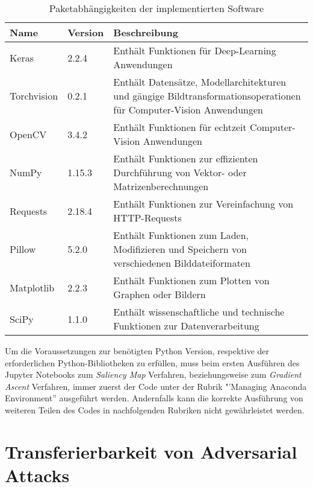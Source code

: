 \begin{table}
	\centering
	\begin{tabular}{|l|l|p{10.4cm}|}
		\hline 
		Name & Version & Beschreibung \\ 
		\hline\hline 
		Keras& 2.2.4  & Enthält Funktionen für Deep-Learning Anwendungen \cite{noauthor_home_nodate} \\ 
		\hline 
		Torchvision& 0.2.1 & Enthält Datensätze, Modellarchitekturen und gängige Bildtransformationsoperationen für Computer-Vision Anwendungen \cite{team_torchvision:_nodate} \\ 
		\hline 
		OpenCV& 3.4.2  & Enthält Funktionen für echtzeit Computer-Vision Anwendungen \cite{noauthor_opencv_nodate} \\ 
		\hline 
		NumPy&  1.15.3& Enthält Funktionen zur effizienten Durchführung von Vektor- oder Matrizenberechnungen \cite{noauthor_numpy_nodate} \\ 
		\hline 
		Requests& 2.18.4 & Enthält Funktionen zur Vereinfachung von HTTP-Requests \cite{noauthor_requests:_nodate} \\ 
		\hline 
		Pillow& 5.2.0 & Enthält Funktionen zum Laden, Modifizieren und Speichern von verschiedenen Bilddateiformaten \cite{noauthor_pillow_nodate} \\ 
		\hline 
		Matplotlib& 2.2.3 & Enthält Funktionen zum Plotten von Graphen oder Bildern \cite{noauthor_matplotlib:_nodate} \\ 
		\hline 
		SciPy& 1.1.0  & Enthält wissenschaftliche und technische Funktionen zur Datenverarbeitung \cite{noauthor_scipy.org_nodate} \\ 
		\hline 
	\end{tabular} 
	\caption{Paketabhängigkeiten der implementierten Software}
	\label{tab:parameter}
\end{table}

Um die Voraussetzungen zur benötigten Python Version, respektive der erforderlichen Python-Bibliotheken zu erfüllen, muss beim ersten Ausführen des Jupyter Notebooks zum \textit{Saliency Map} Verfahren, beziehungsweise zum \textit{Gradient Ascent} Verfahren, immer zuerst der Code unter der Rubrik "'Managing Anaconda Environment” ausgeführt werden. 
Andernfalls kann die korrekte Ausführung von weiteren Teilen des Codes in nachfolgenden Rubriken nicht gewährleistet werden.

\section{Transferierbarkeit von Adversarial Attacks}


